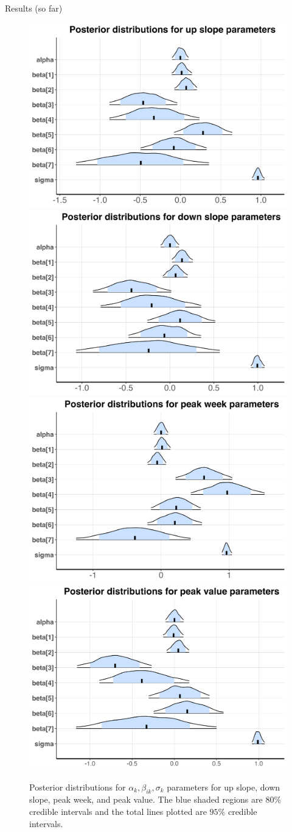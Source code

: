 \begin{block}{Results (so far)}
	\begin{center}
		\begin{figure}
			\includegraphics[width = 0.48\columnwidth]{sections/images/upslope_plot.png}
			\includegraphics[width = 0.48\columnwidth]{sections/images/downslope_plot.png}
			\\
			\includegraphics[width = 0.48\columnwidth]{sections/images/peakwk_plot.png}
			\includegraphics[width = 0.48\columnwidth]{sections/images/peakval_plot.png}\\
			\caption{Posterior distributions for $\alpha_k, \beta_{ik}, \sigma_k$ parameters for up slope, down slope, peak week, and peak value. The blue shaded regions are $80\%$ credible intervals and the total lines plotted are $95 \%$ credible intervals.}

\end{figure}
\end{center}
\end{block}
